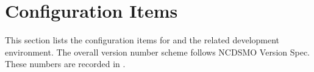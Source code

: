 
\chapter{Configuration Items}
\label{loc:ConfigurationItems}


This section lists the configuration items for \ThisSystem and the related development environment.
The overall version number scheme follows NCDSMO Version Spec.%
These numbers are recorded in \TBD.









